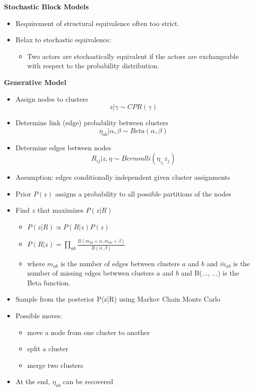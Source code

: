 \documentclass[../notes.tex]{subfiles}
\begin{document}
\textbf{Stochastic Block Models}
\begin{itemize}
  \item Requirement of structural equivalence often too strict.
  \item Relax to stochastic equivalence:
  \begin{itemize}
    \item Two actors are stochastically equivalent if the actors are exchangeable with respect to the probability distribution.
  \end{itemize}
\end{itemize}

\textbf{Generative Model}
\begin{itemize}
  \item Assign nodes to clusters $$z| \gamma \sim CPR(\gamma)$$
  \item Determine link (edge) probability between clusters $$\eta_{ab} | \alpha, \beta \sim Beta(\alpha, \beta)$$
  \item Determine edges between nodes $$R_{ij} | z, \eta \sim Bernoulli(\eta_{z_i}{z_j})$$
  \item Assumption: edges conditionally independent given cluster assignments
  \item Prior $P(z)$ assigns a probability to all possible partitions of the nodes
  \item Find $z$ that maximizes $P(z|R)$
  \begin{itemize}
    \item $P(z|R) \propto P(R|z)P(z)$
    \item $P(R|z) = \prod_{ab} \frac{B(m_{ab} + \alpha, \bar m_{ab} + \beta)}{B(\alpha, \beta)}$
    \item where $m_{ab}$ is the number of edges between clusters $a$ and $b$ and $\bar m_{ab}$ is the number of missing edges betwwen clusters $a$ and $b$ and B(..., ...) is the Beta function.
  \end{itemize}
  \item Sample from the posterior P(z|R) using Markov Chain Monte Carlo
  
  \item Possible moves:
  \begin{itemize}
    \item move a node from one cluster to another
    \item split a cluster
    \item merge two clusters
  \end{itemize}

  \item At the end, $\eta_{ab}$ can be recovered
\end{itemize}
\end{document}
